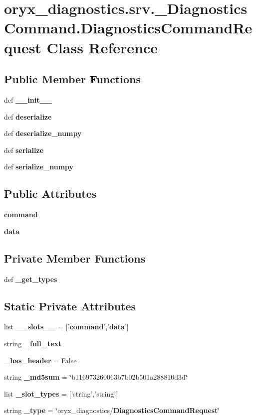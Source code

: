 \section{oryx\-\_\-diagnostics.\-srv.\-\_\-\-Diagnostics\-Command.\-Diagnostics\-Command\-Request \-Class \-Reference}
\label{classoryx__diagnostics_1_1srv_1_1__DiagnosticsCommand_1_1DiagnosticsCommandRequest}
\subsection*{\-Public \-Member \-Functions}
\begin{DoxyCompactItemize}
\item 
def {\bf \-\_\-\-\_\-init\-\_\-\-\_\-}
\item 
def {\bf deserialize}
\item 
def {\bf deserialize\-\_\-numpy}
\item 
def {\bf serialize}
\item 
def {\bf serialize\-\_\-numpy}
\end{DoxyCompactItemize}
\subsection*{\-Public \-Attributes}
\begin{DoxyCompactItemize}
\item 
{\bf command}
\item 
{\bf data}
\end{DoxyCompactItemize}
\subsection*{\-Private \-Member \-Functions}
\begin{DoxyCompactItemize}
\item 
def {\bf \-\_\-get\-\_\-types}
\end{DoxyCompactItemize}
\subsection*{\-Static \-Private \-Attributes}
\begin{DoxyCompactItemize}
\item 
list {\bf \-\_\-\-\_\-slots\-\_\-\-\_\-} = ['{\bf command}','{\bf data}']
\item 
string {\bf \-\_\-full\-\_\-text}
\item 
{\bf \-\_\-has\-\_\-header} = \-False
\item 
string {\bf \-\_\-md5sum} = \char`\"{}b116973260063b7b02b501a288810d3d\char`\"{}
\item 
list {\bf \-\_\-slot\-\_\-types} = ['string','string']
\item 
string {\bf \-\_\-type} = \char`\"{}oryx\-\_\-diagnostics/{\bf \-Diagnostics\-Command\-Request}\char`\"{}
\end{DoxyCompactItemize}


